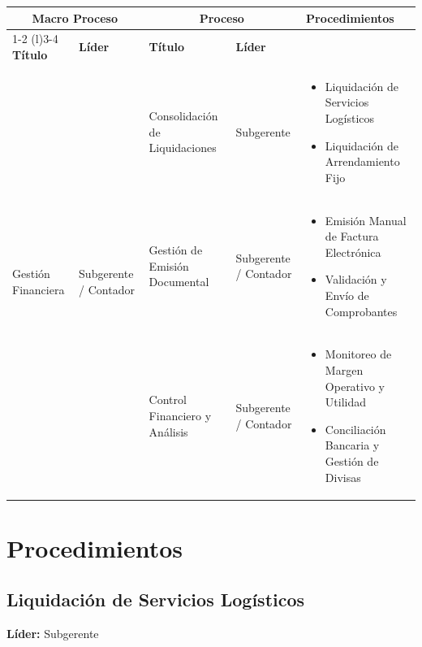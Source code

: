 \documentclass[11pt,letterpaper]{report}
\begin{document}
\vspace{7em}


\begin{center}
  \small
  \begin{tabularx}{\textwidth}{p{}p{}XXp{}}
  \toprule
  \multicolumn{2}{c}{\textbf{Macro Proceso}} & \multicolumn{2}{c}{\textbf{Proceso}} & \multirow{2}{*}{\textbf{Procedimientos}} \\
  \cmidrule(r){1-2} \cmidrule(l){3-4}
  \textbf{Título} & \textbf{Líder} & \textbf{Título} & \textbf{Líder} & \\
  \midrule
  \multirow{3}{=}{Gestión Financiera} & \multirow{3}{=}{Subgerente / Contador} & Consolidación de Liquidaciones & Subgerente & 
  \begin{itemize} \item Liquidación de Servicios Logísticos \item Liquidación de Arrendamiento Fijo \end{itemize} \\
  \cmidrule{3-5}
  & & Gestión de Emisión Documental & Subgerente / Contador & 
  \begin{itemize} \item Emisión Manual de Factura Electrónica \item Validación y Envío de Comprobantes \end{itemize} \\
  \cmidrule{3-5}
  & & Control Financiero y Análisis & Subgerente / Contador & 
  \begin{itemize} \item Monitoreo de Margen Operativo y Utilidad \item Conciliación Bancaria y Gestión de Divisas \end{itemize} \\
  \bottomrule
  \end{tabularx}
\end{center}

\newpage

\chapter{Procedimientos}

\section{Liquidación de Servicios Logísticos}
\textbf{Líder:} Subgerente
\end{document}
